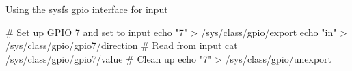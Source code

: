 \begin{frame}
   {Using the sysfs gpio interface for input}
   \begin{raw}
# Set up GPIO 7 and set to input
echo "7" > /sys/class/gpio/export
echo "in" > /sys/class/gpio/gpio7/direction
# Read from input
cat /sys/class/gpio/gpio7/value
# Clean up
echo "7" > /sys/class/gpio/unexport
   \end{raw}
\end{frame}

\cprotect\note{


}

